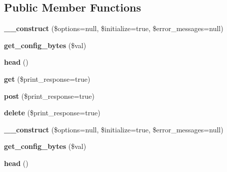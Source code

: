 \subsection*{Public Member Functions}
\begin{DoxyCompactItemize}
\item 
\hypertarget{class_upload_handler_a0cfcfd4573eeeef520a4a8865a813c02}{{\bfseries \-\_\-\-\_\-construct} (\$options=null, \$initialize=true, \$error\-\_\-messages=null)}\label{class_upload_handler_a0cfcfd4573eeeef520a4a8865a813c02}

\item 
\hypertarget{class_upload_handler_a36719734e108fb09388d39728ce7ea1b}{{\bfseries get\-\_\-config\-\_\-bytes} (\$val)}\label{class_upload_handler_a36719734e108fb09388d39728ce7ea1b}

\item 
\hypertarget{class_upload_handler_ab4bb77d19c2f3d6b53e20be06e3515bd}{{\bfseries head} ()}\label{class_upload_handler_ab4bb77d19c2f3d6b53e20be06e3515bd}

\item 
\hypertarget{class_upload_handler_a0a331b917926812f7b7e8ac17e818b8f}{{\bfseries get} (\$print\-\_\-response=true)}\label{class_upload_handler_a0a331b917926812f7b7e8ac17e818b8f}

\item 
\hypertarget{class_upload_handler_abfd28579efb9c71bf4a7ce99c9ffba2a}{{\bfseries post} (\$print\-\_\-response=true)}\label{class_upload_handler_abfd28579efb9c71bf4a7ce99c9ffba2a}

\item 
\hypertarget{class_upload_handler_ac5e612121fb999f225cb5db1b6f72cf6}{{\bfseries delete} (\$print\-\_\-response=true)}\label{class_upload_handler_ac5e612121fb999f225cb5db1b6f72cf6}

\item 
\hypertarget{class_upload_handler_a0cfcfd4573eeeef520a4a8865a813c02}{{\bfseries \-\_\-\-\_\-construct} (\$options=null, \$initialize=true, \$error\-\_\-messages=null)}\label{class_upload_handler_a0cfcfd4573eeeef520a4a8865a813c02}

\item 
\hypertarget{class_upload_handler_a36719734e108fb09388d39728ce7ea1b}{{\bfseries get\-\_\-config\-\_\-bytes} (\$val)}\label{class_upload_handler_a36719734e108fb09388d39728ce7ea1b}

\item 
\hypertarget{class_upload_handler_ab4bb77d19c2f3d6b53e20be06e3515bd}{{\bfseries head} ()}\label{class_upload_handler_ab4bb77d19c2f3d6b53e20be06e3515bd}


\end{DoxyCompactItemize}
